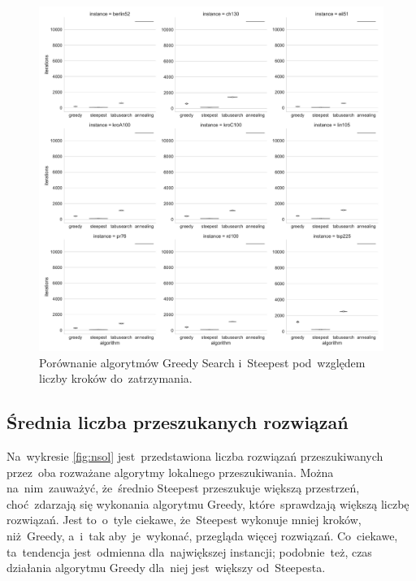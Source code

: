 \begin{figure}[H]
\begin{center}
\includegraphics[width=1.0\textwidth]{graphs/iterations_comparison_violin.pdf}
\end{center}
\caption{Porównanie algorytmów Greedy Search i~Steepest pod~względem liczby kroków do~zatrzymania.}
\label{fig:steps}
\end{figure}

\subsection{Średnia liczba przeszukanych rozwiązań}

Na~wykresie \ref{fig:nsol} jest~przedstawiona liczba rozwiązań przeszukiwanych przez~oba rozważane algorytmy lokalnego przeszukiwania. Można na~nim~zauważyć, że~średnio Steepest przeszukuje większą przestrzeń, choć~zdarzają się wykonania algorytmu Greedy, które~sprawdzają większą liczbę rozwiązań. Jest to~o~tyle ciekawe, że~Steepest wykonuje mniej kroków, niż~Greedy, a~i~tak aby~je~wykonać, przegląda więcej rozwiązań. Co~ciekawe, ta~tendencja jest~odmienna dla~największej instancji; podobnie~też, czas działania algorytmu Greedy dla~niej jest~większy od~Steepesta.

